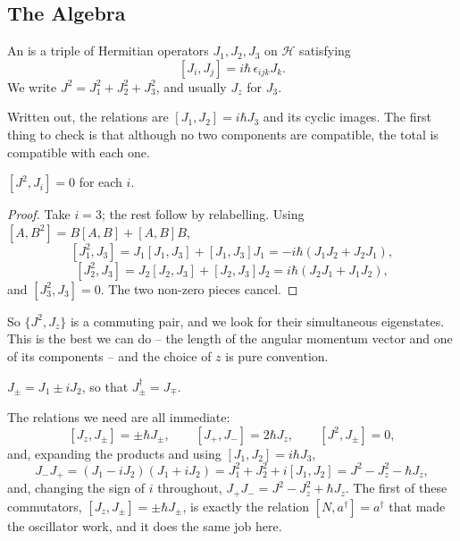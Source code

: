 \documentclass[a4paper]{scrartcl}
\begin{document}
\subsection{The Algebra}

\begin{definition}
    An  is a triple of Hermitian operators $J_1, J_2, J_3$ on $\mathcal{H}$ satisfying
    $$
    [J_i, J_j] = i \hbar \, \epsilon_{ijk} J_k.
    $$
    We write $J^2 = J_1^2 + J_2^2 + J_3^2$, and usually $J_z$ for $J_3$.
\end{definition}

Written out, the relations are $[J_1,J_2] = i\hbar J_3$ and its cyclic images. The first thing to check is that although no two components are compatible, the total is compatible with each one.

\begin{proposition}
    $[J^2, J_i] = 0$ for each $i$.
\end{proposition}
\begin{proof}
    Take $i = 3$; the rest follow by relabelling. Using $[A, B^2] = B[A,B] + [A,B]B$,
    $$
    [J_1^2, J_3] = J_1[J_1,J_3] + [J_1,J_3]J_1 = -i\hbar(J_1 J_2 + J_2 J_1),
    $$
    $$
    [J_2^2, J_3] = J_2[J_2,J_3] + [J_2,J_3]J_2 = i\hbar(J_2 J_1 + J_1 J_2),
    $$
    and $[J_3^2, J_3] = 0$. The two non-zero pieces cancel.
\end{proof}

So $\{J^2, J_z\}$ is a commuting pair, and we look for their simultaneous eigenstates. This is the best we can do -- the length of the angular momentum vector and one of its components -- and the choice of $z$ is pure convention.

\begin{definition}
    $J_\pm = J_1 \pm i J_2$, so that $J_\pm^\dagger = J_\mp$.
\end{definition}

The relations we need are all immediate:
$$
[J_z, J_\pm] = \pm \hbar J_\pm, \qquad [J_+, J_-] = 2\hbar J_z, \qquad [J^2, J_\pm] = 0,
$$
and, expanding the products and using $[J_1,J_2] = i\hbar J_3$,
$$
J_-J_+ = (J_1-iJ_2)(J_1+iJ_2) = J_1^2 + J_2^2 + i[J_1,J_2] = J^2 - J_z^2 - \hbar J_z,
$$
and, changing the sign of $i$ throughout, $J_+J_- = J^2 - J_z^2 + \hbar J_z$. The first of these commutators, $[J_z, J_\pm] = \pm\hbar J_\pm$, is exactly the relation $[N, a^\dagger] = a^\dagger$ that made the oscillator work, and it does the same job here.
\end{document}
